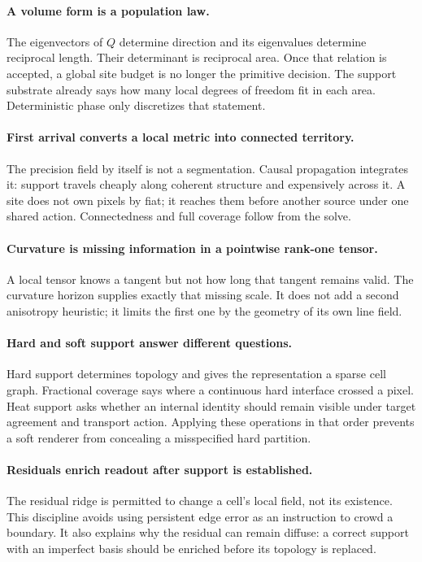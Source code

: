\documentclass[11pt,letterpaper]{article}
\begin{document}
\paragraph{A volume form is a population law.}
The eigenvectors of \(Q\) determine direction and its eigenvalues determine reciprocal
length. Their determinant is reciprocal area. Once that relation is accepted, a global
site budget is no longer the primitive decision. The support substrate already says how
many local degrees of freedom fit in each area. Deterministic phase only discretizes
that statement.

\paragraph{First arrival converts a local metric into connected territory.}
The precision field by itself is not a segmentation. Causal propagation integrates it:
support travels cheaply along coherent structure and expensively across it. A site does
not own pixels by fiat; it reaches them before another source under one shared action.
Connectedness and full coverage follow from the solve.

\paragraph{Curvature is missing information in a pointwise rank-one tensor.}
A local tensor knows a tangent but not how long that tangent remains valid. The
curvature horizon supplies exactly that missing scale. It does not add a second
anisotropy heuristic; it limits the first one by the geometry of its own line field.

\paragraph{Hard and soft support answer different questions.}
Hard support determines topology and gives the representation a sparse cell graph.
Fractional coverage says where a continuous hard interface crossed a pixel. Heat
support asks whether an internal identity should remain visible under target agreement
and transport action. Applying these operations in that order prevents a soft renderer
from concealing a misspecified hard partition.

\paragraph{Residuals enrich readout after support is established.}
The residual ridge is permitted to change a cell's local field, not its existence.
This discipline avoids using persistent edge error as an instruction to crowd a
boundary. It also explains why the residual can remain diffuse: a correct support with
an imperfect basis should be enriched before its topology is replaced.
\end{document}
